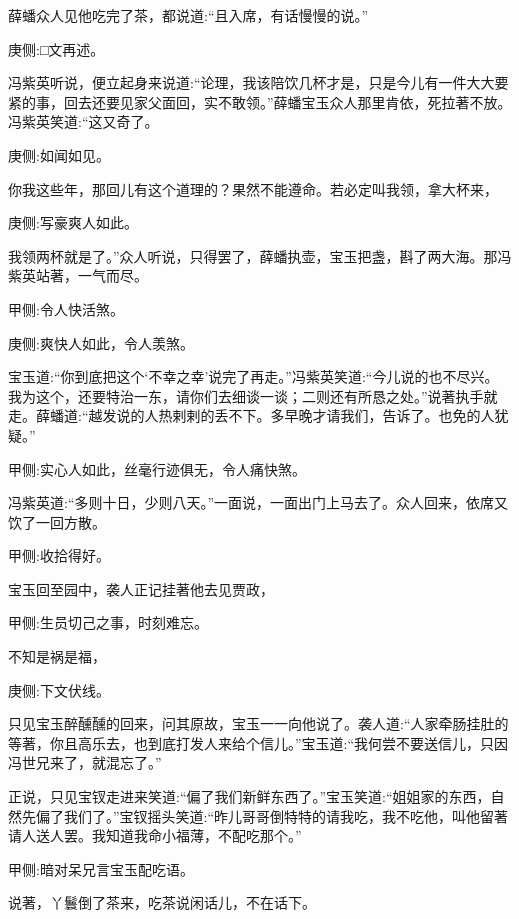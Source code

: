 \begin{parag}
    薛蟠众人见他吃完了茶，都说道:“且入席，有话慢慢的说。”\begin{note}庚侧:□文再述。\end{note}冯紫英听说，便立起身来说道:“论理，我该陪饮几杯才是，只是今儿有一件大大要紧的事，回去还要见家父面回，实不敢领。”薛蟠宝玉众人那里肯依，死拉著不放。冯紫英笑道:“这又奇了。\begin{note}庚侧:如闻如见。\end{note}你我这些年，那回儿有这个道理的？果然不能遵命。若必定叫我领，拿大杯来，\begin{note}庚侧:写豪爽人如此。\end{note}我领两杯就是了。”众人听说，只得罢了，薛蟠执壶，宝玉把盏，斟了两大海。那冯紫英站著，一气而尽。\begin{note}甲侧:令人快活煞。\end{note}\begin{note}庚侧:爽快人如此，令人羡煞。\end{note}宝玉道:“你到底把这个‘不幸之幸’说完了再走。”冯紫英笑道:“今儿说的也不尽兴。我为这个，还要特治一东，请你们去细谈一谈；二则还有所恳之处。”说著执手就走。薛蟠道:“越发说的人热剌剌的丢不下。多早晚才请我们，告诉了。也免的人犹疑。”\begin{note}甲侧:实心人如此，丝毫行迹俱无，令人痛快煞。\end{note}冯紫英道:“多则十日，少则八天。”一面说，一面出门上马去了。众人回来，依席又饮了一回方散。\begin{note}甲侧:收拾得好。\end{note}
\end{parag}


\begin{parag}
    宝玉回至园中，袭人正记挂著他去见贾政，\begin{note}甲侧:生员切己之事，时刻难忘。\end{note}不知是祸是福，\begin{note}庚侧:下文伏线。\end{note}只见宝玉醉醺醺的回来，问其原故，宝玉一一向他说了。袭人道:“人家牵肠挂肚的等著，你且高乐去，也到底打发人来给个信儿。”宝玉道:“我何尝不要送信儿，只因冯世兄来了，就混忘了。”
\end{parag}


\begin{parag}
    正说，只见宝钗走进来笑道:“偏了我们新鲜东西了。”宝玉笑道:“姐姐家的东西，自然先偏了我们了。”宝钗摇头笑道:“昨儿哥哥倒特特的请我吃，我不吃他，叫他留著请人送人罢。我知道我命小福薄，不配吃那个。”\begin{note}甲侧:暗对呆兄言宝玉配吃语。\end{note}说著，丫鬟倒了茶来，吃茶说闲话儿，不在话下。
\end{parag}


